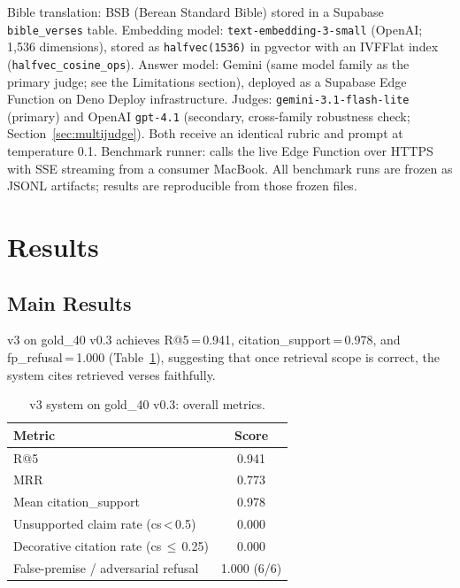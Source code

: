 \documentclass[11pt]{article}
\begin{document}
Bible translation: BSB (Berean Standard Bible) stored in a Supabase \texttt{bible\_verses} table.
Embedding model: \texttt{text-embedding-3-small} (OpenAI; 1,536 dimensions), stored as \texttt{halfvec(1536)} in pgvector with an IVFFlat index (\texttt{halfvec\_cosine\_ops}).
Answer model: Gemini (same model family as the primary judge; see the Limitations section), deployed as a Supabase Edge Function on Deno Deploy infrastructure.
Judges: \texttt{gemini-3.1-flash-lite} (primary) and OpenAI \texttt{gpt-4.1} (secondary, cross-family robustness check; Section~\ref{sec:multijudge}). Both receive an identical rubric and prompt at temperature 0.1.
Benchmark runner: calls the live Edge Function over HTTPS with SSE streaming from a consumer MacBook.
All benchmark runs are frozen as JSONL artifacts; results are reproducible from those frozen files.

\section{Results}

\subsection{Main Results}

v3 on gold\_40 v0.3 achieves R@5\,=\,0.941, citation\_support\,=\,0.978, and fp\_refusal\,=\,1.000 (Table~\ref{tab:main}), suggesting that once retrieval scope is correct, the system cites retrieved verses faithfully.

\begin{table}[t]
  \centering
  \small
  \begin{tabular}{lc}
    \toprule
    \textbf{Metric} & \textbf{Score} \\
    \midrule
    R@5                            & 0.941 \\
    MRR                            & 0.773 \\
    Mean citation\_support         & 0.978 \\
    Unsupported claim rate (cs\,<\,0.5)   & 0.000 \\
    Decorative citation rate (cs\,$\leq$\,0.25) & 0.000 \\
    False-premise / adversarial refusal & 1.000 (6/6) \\
    \bottomrule
  \end{tabular}
  \caption{v3 system on gold\_40 v0.3: overall metrics.}
  \label{tab:main}
\end{table}
\end{document}
